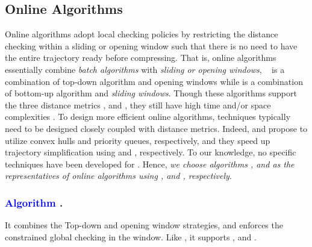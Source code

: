 \subsection{Online Algorithms}

Online \lsa algorithms adopt local checking policies by restricting the distance checking within a sliding or opening window such that there is no need to have the entire trajectory ready before compressing. That is, online algorithms essentially combine {\em batch algorithms} with {\em sliding or opening windows}, \eg\
\opwa \cite{Meratnia:Spatiotemporal} is a combination of top-down algorithm \dpa and opening windows while  \cite{Keogh:online} is a combination of bottom-up algorithm \tpa and \textit{sliding windows}.
Though these algorithms support the three distance metrics \ped, \sed and \dad, they still have high time and/or space complexities \cite{Liu:BQS}.
To design more efficient online algorithms, techniques typically need to be designed closely coupled with distance metrics.
Indeed, \bqsa \cite{Liu:BQS} and \squishe \cite{Muckell:Compression} propose to utilize convex hulls and priority queues, respectively, and they speed up trajectory simplification using \ped and \sed, respectively. To our knowledge, no specific techniques have been developed for \dad.
Hence, {\em we choose algorithms \bqsa, \squishe and \opwa as the representatives of online algorithms using \ped, \sed and \dad, respectively}.

\subsubsection{\textcolor{blue}{Algorithm \opwa \cite{Meratnia:Spatiotemporal}}.}
It combines the Top-down and opening window strategies, and enforces the constrained global checking in the window. Like \dpa, it supports \ped, \sed and \dad.

